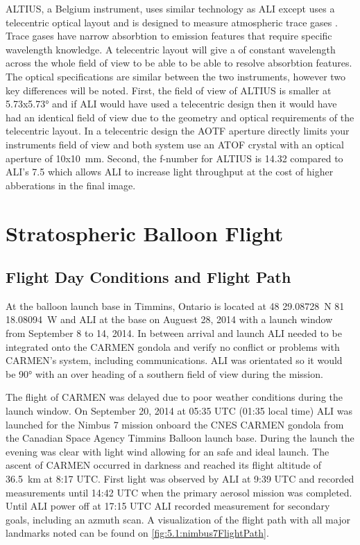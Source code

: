 \documentclass[12pt, draft]{article}
\begin{document}
 ALTIUS, a Belgium instrument, uses similar technology as ALI except uses a telecentric optical layout and is designed to measure atmospheric trace gases \citep{Dekemper2012}. Trace gases have narrow absorbtion to emission features that require specific wavelength knowledge. A telecentric layout will give a of constant wavelength across the whole field of view to be able to be able to resolve absorbtion features. The optical specifications are similar between the two instruments, however two key differences will be noted. First, the field of view of ALTIUS is smaller at 5.73x5.73\si{\degree} and if ALI would have used a telecentric design then it would have had an identical field of view due to the geometry and optical requirements of the telecentric layout. In a telecentric design the AOTF aperture directly limits your instruments field of view and both system use an ATOF crystal with an optical aperture of 10x10~mm. Second, the f-number for ALTIUS is 14.32 compared to ALI's 7.5 which allows ALI to increase light throughput at the cost of higher abberations in the final image.

\section{Stratospheric Balloon Flight}

\subsection{Flight Day Conditions and Flight Path}

At the balloon launch base in Timmins, Ontario is located at 48 29.08728~N 81 18.08094~W and ALI at the base on Auguest 28, 2014 with a launch window from September 8 to 14, 2014. In between arrival and launch ALI needed to be integrated onto the CARMEN gondola and verify no conflict or problems with CARMEN's system, including communications. ALI was orientated so it would be 90\si{\degree} with an over heading of a southern field of view during the mission.

The flight of CARMEN was delayed due to poor weather conditions during the launch window. On September 20, 2014 at 05:35 UTC (01:35 local time) ALI was launched for the Nimbus 7 mission onboard the CNES CARMEN gondola from the Canadian Space Agency Timmins Balloon launch base. During the launch the evening was clear with light wind allowing for an safe and ideal launch. The ascent of CARMEN occurred in darkness and reached its flight altitude of 36.5~km at 8:17 UTC. First light was observed by ALI at 9:39 UTC and recorded measurements until 14:42 UTC when the primary aerosol mission was completed. Until ALI power off at 17:15 UTC ALI recorded measurement for secondary goals, including an azmuth scan. A visualization of the flight path with all major landmarks noted can be found on \autoref{fig:5.1:nimbus7FlightPath}.
\end{document}
